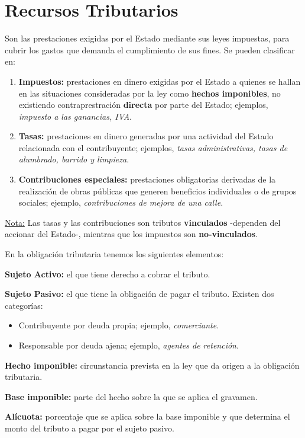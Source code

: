 \documentclass[10pt,a4paper]{article}
\begin{document}
\section{Recursos Tributarios}

Son las prestaciones exigidas por el Estado mediante sus leyes impuestas, para cubrir los gastos que demanda el cumplimiento de sus fines. Se pueden clasificar en:

\begin{enumerate}
\item \textbf{Impuestos:} prestaciones en dinero exigidas por el Estado a quienes se hallan en las situaciones consideradas por la ley como \textbf{hechos imponibles}, no existiendo contraprestración \textbf{directa} por parte del Estado; ejemplos, \textit{impuesto a las ganancias, IVA}.
\item \textbf{Tasas:} prestaciones en dinero generadas por una actividad del Estado relacionada con el contribuyente; ejemplos, \textit{tasas administrativas, tasas de alumbrado, barrido y limpieza}.
\item \textbf{Contribuciones especiales:} prestaciones obligatorias derivadas de la realización de obras públicas que generen beneficios individuales o de grupos sociales; ejemplo, \textit{contribuciones de mejora de una calle}.
\end{enumerate}

\underline{Nota:} Las tasas y las contribuciones son tributos \textbf{vinculados} -dependen del accionar del Estado-, mientras que los impuestos son \textbf{no-vinculados}.

En la obligación tributaria tenemos los siguientes elementos:

\begin{description}
\item \textbf{Sujeto Activo:} el que tiene derecho a cobrar el tributo.
\item \textbf{Sujeto Pasivo:} el que tiene la obligación de pagar el tributo. Existen dos categorías:
\begin{itemize}
\item Contribuyente por deuda propia; ejemplo, \textit{comerciante}.
\item Responsable por deuda ajena; ejemplo, \textit{agentes de retención}.
\end{itemize}
\item \textbf{Hecho imponible:} circunstancia prevista en la ley que da origen a la obligación tributaria.
\item \textbf{Base imponible:} parte del hecho sobre la que se aplica el gravamen.
\item \textbf{Alícuota:} porcentaje que se aplica sobre la base imponible y que determina el monto del tributo a pagar por el sujeto pasivo.
\end{description}
\end{document}
